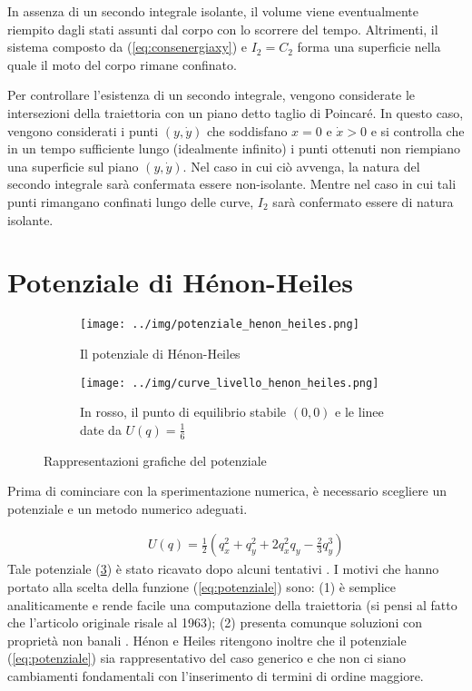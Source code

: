 \documentclass[a4paper]{article}
\numberwithin{equation}{section}
\numberwithin{figure}{section}
\begin{document}
In assenza di un secondo integrale isolante, il volume viene eventualmente riempito
dagli stati assunti dal corpo con lo scorrere del tempo.
Altrimenti, il sistema composto da (\ref{eq:consenergiaxy}) e $I_2 = C_2$ forma una
superficie nella quale il moto del corpo rimane confinato.

Per controllare l'esistenza di un secondo integrale, vengono considerate le intersezioni della
traiettoria con un piano detto taglio di Poincaré. In questo caso, vengono considerati i punti
$(y,\dot{y})$ che soddisfano $x=0$ e $\dot{x}>0$ e si controlla che in un tempo sufficiente lungo
(idealmente infinito) i punti ottenuti non riempiano una superficie sul piano $(y,\dot{y})$. Nel
caso in cui ciò avvenga, la natura del secondo integrale sarà confermata essere non-isolante. Mentre
nel caso in cui tali punti rimangano confinati lungo delle curve, $I_2$ sarà confermato essere di natura
isolante.

\section{Potenziale di Hénon-Heiles}

\begin{figure}[h!]
	\centering
	\begin{subfigure}[t]{.5\textwidth}
		\centering
		\texttt{[image: ../img/potenziale\_henon\_heiles.png]}
		\caption{Il potenziale di Hénon-Heiles}
		\label{img:potenziale3d}
	\end{subfigure}%
	\begin{subfigure}[t]{.5\textwidth}
		\centering
		\texttt{[image: ../img/curve\_livello\_henon\_heiles.png]}
		\caption{In rosso, il punto di equilibrio stabile $(0,0)$ e le linee date da
		$U(q)=\frac{1}{6}$} 
		\label{img:curvelivello}
	\end{subfigure}
	\caption{Rappresentazioni grafiche del potenziale}
	\label{img:potenzialehh}
\end{figure}

Prima di cominciare con la sperimentazione numerica, è necessario scegliere un potenziale e un
metodo numerico adeguati.

\begin{eqnarray}	
	&&U(q) = \frac{1}{2}(q_x^2+q_y^2+2q_x^2q_y-\frac{2}{3}q_y^3) \label{eq:potenziale}
\end{eqnarray}
Tale potenziale (\ref{img:potenzialehh}) è stato ricavato dopo alcuni tentativi
\cite{1964henonheiles}.
I motivi che hanno portato alla scelta della funzione (\ref{eq:potenziale}) sono: (1)
è semplice analiticamente e rende facile una computazione della traiettoria (si pensi al fatto
che l'articolo originale risale al 1963);
(2) presenta comunque soluzioni con proprietà non banali \cite{hairer}. 
Hénon e Heiles ritengono inoltre che il potenziale (\ref{eq:potenziale}) sia rappresentativo del caso
generico e che non ci siano cambiamenti fondamentali con l'inserimento di termini di ordine maggiore.
\end{document}
